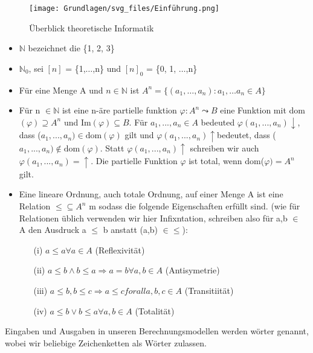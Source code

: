 \begin{figure}
    \centering
    \texttt{[image: Grundlagen/svg\_files/Einführung.png]}
    \caption{Überblick theoretische Informatik}
    \label{fig:example}
\end{figure}
\begin{itemize}
    \item \(\mathbb{N}\) bezeichnet die \{1, 2, 3\}
    \item \(\mathbb{N}_{0}\), sei \([n]\) = \{1,\(\ldots \),n\} und \([n]_{0}\) = \{0, 1, \(\ldots \),n\} 
    \item Für eine Menge A und \(n \in \mathbb{N}\) ist \(A^{n} = \{(a_{1},\ldots, a_{n}): a_{1}, \ldots a_{n}\in A\}\)
    \item Für n \(\in \mathbb{N}\) ist eine n-äre partielle funktion \(\varphi : A^{n} \leadsto B \) eine Funktion mit dom\((\varphi) \supseteq A^{n}\) und Im\((\varphi) \subseteq B.\) 
    Für \(a_{1}, ..., a_{n} \in A\) bedeuted \(\varphi(a_{1}, ..., a_{n})\downarrow\), dass (\(a_{1}, ..., a_{n})\in \text{dom}(\varphi)\) gilt und \(\varphi(a_{1}, ..., a_{n})\uparrow \)bedeutet, 
    dass (\(a_{1}, ..., a_{n}) \notin \text{dom}(\varphi)\). Statt \(\varphi(a_{1}, ..., a_{n})\uparrow\) schreiben wir auch \(\varphi(a_{1}, ..., a_{n}) = \uparrow\).
    Die partielle Funktion \(\varphi\) ist total, wenn dom(\(\varphi) = A^{n}\) gilt.
    \item Eine lineare Ordnung, auch totale Ordnung, auf einer Menge A ist eine Relation \(\leq  \subseteq  A^{n}\) m sodass die folgende Eigenschaften erfüllt sind. 
    (wie für Relationen üblich verwenden wir hier Infixntation, schreiben also für a,b \(\in\) A den Ausdruck a \(\leq\)  b anstatt (a,b) \(\in \leq\)): 
    \begin{enumerate}
        \item[(i)] \(a \leq  a \forall a \in A\) (Reflexivität)
        \item[(ii)]\( a \leq  b  \land  b \leq  a \Rightarrow  a = b \forall a,b \in A\) (Antisymetrie)
        \item[(iii)] \(a \leq  b, b \leq  c \Rightarrow a \leq  c foralla,b,c \in A\) (Transitiität)
        \item[(iv)] \(a \leq  b \vee b \leq  a \forall a,b \in A\) (Totalität)
    \end{enumerate} 
\end{itemize}
\newpage
   

    Eingaben und Ausgaben in unseren Berechnungsmodellen werden wörter genannt, wobei wir beliebige Zeichenketten als Wörter zulassen.

